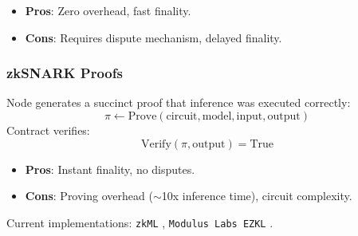\begin{itemize}
\item \textbf{Pros}: Zero overhead, fast finality.
\item \textbf{Cons}: Requires dispute mechanism, delayed finality.
\end{itemize}

\subsubsection{zkSNARK Proofs}

Node generates a succinct proof that inference was executed correctly:
\[
\pi \leftarrow \text{Prove}(\text{circuit}, \text{model}, \text{input}, \text{output})
\]
Contract verifies:
\[
\text{Verify}(\pi, \text{output}) = \text{True}
\]

\begin{itemize}
\item \textbf{Pros}: Instant finality, no disputes.
\item \textbf{Cons}: Proving overhead ($\sim$10x inference time), circuit complexity.
\end{itemize}

Current implementations: \texttt{zkML} \cite{zkml2023}, \texttt{Modulus Labs EZKL} \cite{ezkl2023}.

